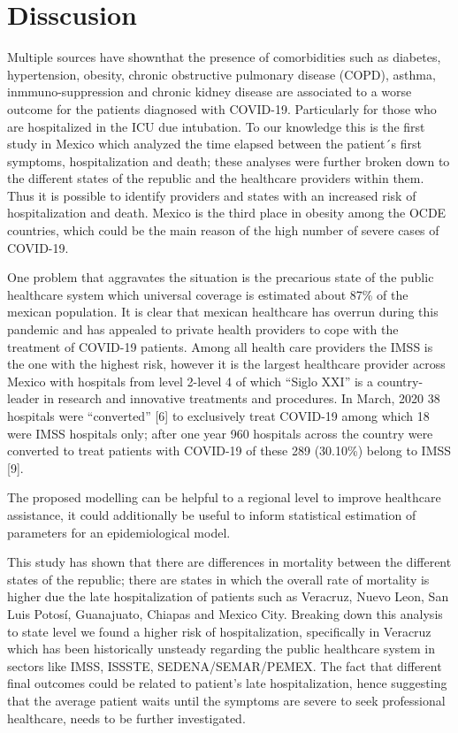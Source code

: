 \documentclass[10pt,letterpaper]{article}
\begin{document}
\hypertarget{disscusion}{%
\section{Disscusion}\label{disscusion}}

Multiple sources have shownthat the presence of comorbidities such
as diabetes, hypertension, obesity, chronic obstructive pulmonary
disease (COPD), asthma, inmmuno-suppression and chronic kidney disease
are associated to a worse outcome for the patients diagnosed with
COVID-19. Particularly for those who are hospitalized in the ICU due
intubation. To our knowledge this is the first study in Mexico which
analyzed the time elapsed between the patient´s first symptoms,
hospitalization and death; these analyses were further broken down to the
different states of the republic and the healthcare providers within
them. Thus it is possible to identify providers and states with an increased
risk of hospitalization and death. Mexico is the
third place in obesity among the OCDE countries, which could be the main reason of the high number of severe cases of COVID-19.

One problem that aggravates the situation is the precarious state of the public
healthcare system which universal coverage is estimated about 87\% of
the mexican population. It is clear that mexican healthcare has overrun
during this pandemic and has appealed to private health providers to
cope with the treatment of COVID-19 patients. Among all health care
providers the IMSS is the one with the highest risk, however
it is the largest healthcare provider across Mexico with hospitals from
level 2-level 4 of which ``Siglo XXI'' is a country-leader in
research and innovative treatments and procedures. In March, 2020 38  hospitals were ``converted'' {[}6{]} to exclusively treat
COVID-19  among which 18 were IMSS hospitals
only; after one year 960 hospitals across the country were converted to
treat patients with COVID-19 of these 289 (30.10\%) belong to IMSS
{[}9{]}.

The proposed modelling can be helpful to a regional level to improve healthcare
assistance, it could additionally be useful to inform statistical
estimation of parameters for an epidemiological model.



This study has shown that there are differences in mortality between the
different states of the republic; there are states in which the overall
rate of mortality is higher due the late hospitalization of patients
such as Veracruz, Nuevo Leon, San Luis Potosí, Guanajuato, Chiapas and
Mexico City. Breaking down this analysis to state level we found a
higher risk of hospitalization, specifically in Veracruz  which
 has been historically unsteady regarding the public healthcare system in
sectors like IMSS, ISSSTE, SEDENA/SEMAR/PEMEX. The fact that different final outcomes could be related to patient's
late hospitalization, hence suggesting that the average patient waits
until the symptoms are severe to seek professional healthcare, needs to
be further investigated.
\end{document}
